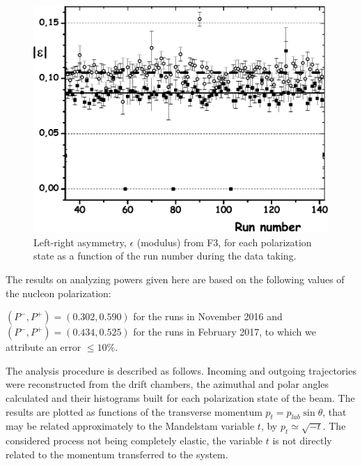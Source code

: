 \documentclass[twocolumn,epjc3]{svjour3}
\begin{document}
\begin{figure}
  \centering
  \includegraphics[width=1.00\columnwidth]{fig13_pol_F3.pdf}
  \caption{Left-right asymmetry, $\epsilon$ (modulus) from F3, for each polarization state as a function of the run number during the data taking.}
  \label{polarim}
\end{figure}

The results on analyzing powers given here are based on the following values of the nucleon polarization:

$(P^{-}, P^{+})=(0.302,0.590) $ for the runs in November 2016 and $(P^{-}, P^{+})=(0.434,0.525)$ for the runs in February 2017, to which we attribute an error $\le 10\%$.

The analysis procedure is described as follows. Incoming and outgoing trajectories were reconstructed from the drift chambers, the azimuthal and polar angles calculated and their histograms built for each polarization state of the beam.  The results are plotted as functions of the transverse momentum $p_t=p_{lab}\sin \theta$, that may be related approximately to the Mandelstam variable $t$, by $p_t\simeq \sqrt{-t}$. The considered process not being completely elastic, the variable $t$ is not directly related to the momentum transferred to the system.
\end{document}
